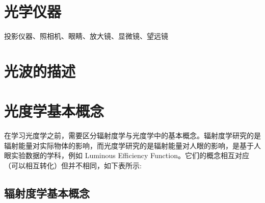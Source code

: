 \documentclass[UTF8]{report}
\theoremstyle{MyLineTheoremStyle} %
\theoremstyle{MyBlockTheoremStyle} %
\theoremstyle{MySubsubsectionStyle} %
\begin{document}
\section{光学仪器}

投影仪器、照相机、眼睛、放大镜、显微镜、望远镜

\section{光波的描述}
\section{光度学基本概念}

在学习光度学之前，需要区分辐射度学与光度学中的基本概念。辐射度学研究的是辐射能量对实际物体的影响，而光度学研究的是辐射能量对人眼的影响，是基于人眼实验数据的学科，例如 Luminous Efficiency Function。它们的概念相互对应（可以相互转化）但并不相同，如下表所示: 
\begin{table}[H]\centering
    \caption{\textbf{光度学与辐射度学概念对应关系}}
    \label{光度学与辐射度学概念对应关系}
\end{table}



\subsection{辐射度学基本概念}
\end{document}
